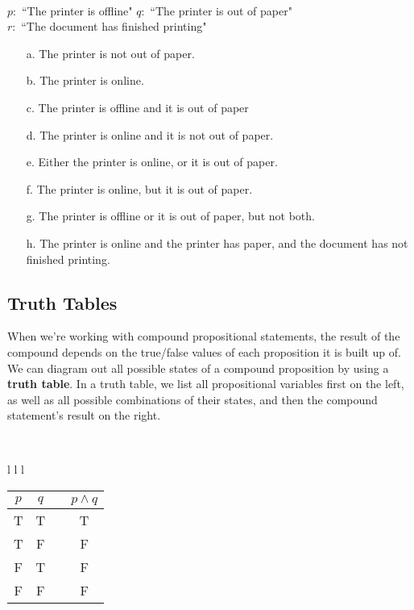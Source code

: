 {\begin{questionNOGRADE}{\thequestion}
        ~\\ $p:$ ``The printer is offline" \tab
        $q:$ ``The printer is out of paper" \\ 
        $r:$ ``The document has finished printing"


        \begin{enumerate}
            \item[a.] The printer is not out of paper.
            \item[b.] The printer is online.
            \item[c.] The printer is offline and it is out of paper
            \item[d.] The printer is online and it is not out of paper.
            \item[e.] Either the printer is online, or it is out of paper.
            \item[f.] The printer is online, but it is out of paper.
            \item[g.] The printer is offline or it is out of paper, but not both.
            \item[h.] The printer is online and the printer has paper, and the document has not finished printing.
        \end{enumerate}
    \end{questionNOGRADE}

    \newpage

    \subsection{Truth Tables}

    \begin{introNOHEAD}{}
        When we're working with compound propositional statements,
        the result of the compound depends on the true/false values
        of each proposition it is built up of.
        ~\\
        We can diagram out all possible states of a compound proposition
        by using a \textbf{truth table}. In a truth table, we list
        all propositional variables first on the left, as well as
        all possible combinations of their states, and then
        the compound statement's result on the right.

        ~\\

        \begin{tabular}{ l l l }

            \begin{tabular}{ | c | c | c | c | }
                \hline
                $p$ & $q$ & & $p \land q$ \\ \hline
                T & T & & T \\ \hline
                T & F & & F \\ \hline
                F & T & & F \\ \hline
                F & F & & F \\ \hline


\end{tabular}
\end{tabular}
\end{introNOHEAD}}

